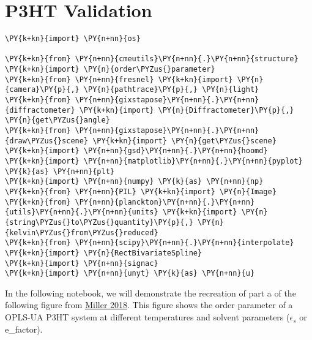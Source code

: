 
    \hypertarget{p3ht-validation}{%
\section{P3HT Validation}\label{p3ht-validation}}

    \begin{tcolorbox}[breakable, size=fbox, boxrule=1pt, pad at break*=1mm,colback=cellbackground, colframe=cellborder]
\begin{Verbatim}[commandchars=\\\{\}]
\PY{k+kn}{import} \PY{n+nn}{os}

\PY{k+kn}{from} \PY{n+nn}{cmeutils}\PY{n+nn}{.}\PY{n+nn}{structure} \PY{k+kn}{import} \PY{n}{order\PYZus{}parameter}
\PY{k+kn}{from} \PY{n+nn}{fresnel} \PY{k+kn}{import} \PY{n}{camera}\PY{p}{,} \PY{n}{pathtrace}\PY{p}{,} \PY{n}{light}
\PY{k+kn}{from} \PY{n+nn}{gixstapose}\PY{n+nn}{.}\PY{n+nn}{diffractometer} \PY{k+kn}{import} \PY{n}{Diffractometer}\PY{p}{,} \PY{n}{get\PYZus{}angle}
\PY{k+kn}{from} \PY{n+nn}{gixstapose}\PY{n+nn}{.}\PY{n+nn}{draw\PYZus{}scene} \PY{k+kn}{import} \PY{n}{get\PYZus{}scene}
\PY{k+kn}{import} \PY{n+nn}{gsd}\PY{n+nn}{.}\PY{n+nn}{hoomd}
\PY{k+kn}{import} \PY{n+nn}{matplotlib}\PY{n+nn}{.}\PY{n+nn}{pyplot} \PY{k}{as} \PY{n+nn}{plt}
\PY{k+kn}{import} \PY{n+nn}{numpy} \PY{k}{as} \PY{n+nn}{np}
\PY{k+kn}{from} \PY{n+nn}{PIL} \PY{k+kn}{import} \PY{n}{Image}
\PY{k+kn}{from} \PY{n+nn}{planckton}\PY{n+nn}{.}\PY{n+nn}{utils}\PY{n+nn}{.}\PY{n+nn}{units} \PY{k+kn}{import} \PY{n}{string\PYZus{}to\PYZus{}quantity}\PY{p}{,} \PY{n}{kelvin\PYZus{}from\PYZus{}reduced}
\PY{k+kn}{from} \PY{n+nn}{scipy}\PY{n+nn}{.}\PY{n+nn}{interpolate} \PY{k+kn}{import} \PY{n}{RectBivariateSpline}
\PY{k+kn}{import} \PY{n+nn}{signac}
\PY{k+kn}{import} \PY{n+nn}{unyt} \PY{k}{as} \PY{n+nn}{u}
\end{Verbatim}
\end{tcolorbox}

    In the following notebook, we will demonstrate the recreation of part a
of the following figure from
\href{http://www.mdpi.com/2073-4360/10/12/1305}{Miller 2018}. This
figure shows the order parameter of a OPLS-UA P3HT system at different
temperatures and solvent parameters (\(\epsilon_{s}\) or e\_factor).

    \begin{center}
    \end{center}

